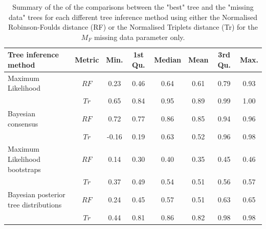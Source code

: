 \begin{landscape}
\begin{table}[ht]
\caption{Summary of the of the comparisons between the "best" tree and the "missing data" trees for each different tree inference method using either the Normalised Robinson-Foulds distance (RF) or the Normalised Triplets distance (Tr) for the $M_{F}$ missing data parameter only.}
\label{Tab_Supp_summary_metric_MF}
\centering
\begin{tabular}{lccccccc}
  \hline
 Tree inference method & Metric & Min. & 1st Qu. & Median & Mean & 3rd Qu. & Max. \\ 
  \hline
  Maximum Likelihood                    & $RF$ & 0.23 & 0.46 & 0.64 & 0.61 & 0.79 & 0.93 \\ 
                                        & $Tr$ & 0.65 & 0.84 & 0.95 & 0.89 & 0.99 & 1.00 \\ 
  Bayesian consensus                    & $RF$ & 0.72 & 0.77 & 0.86 & 0.85 & 0.94 & 0.96 \\ 
                                        & $Tr$ & -0.16 & 0.19 & 0.63 & 0.52 & 0.96 & 0.98 \\ 
  Maximum Likelihood bootstraps         & $RF$ & 0.14 & 0.30 & 0.40 & 0.35 & 0.45 & 0.46 \\ 
                                        & $Tr$ & 0.37 & 0.49 & 0.54 & 0.51 & 0.56 & 0.57 \\ 
  Bayesian posterior tree distributions & $RF$ & 0.24 & 0.45 & 0.57 & 0.51 & 0.63 & 0.65 \\ 
                                        & $Tr$ & 0.44 & 0.81 & 0.86 & 0.82 & 0.98 & 0.98 \\ 
   \hline
\end{tabular}
\end{table}
\end{landscape}

